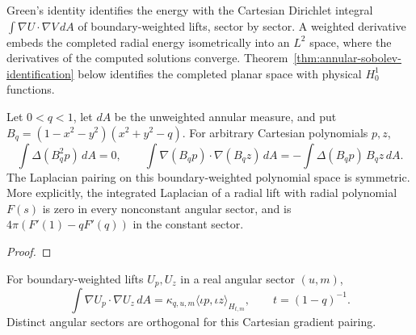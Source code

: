 

Green's identity identifies the energy with the Cartesian Dirichlet integral
$\int\nabla U\cdot\nabla V\,dA$ of boundary-weighted lifts, sector by sector.
A weighted derivative embeds the completed radial energy isometrically into
an $L^2$ space, where the derivatives of the computed solutions converge.
Theorem~\ref{thm:annular-sobolev-identification} below identifies the completed
planar space with physical $H^1_0$ functions.

\begin{supporting}
\begin{theorem}
\label{thm:annular-polynomial-green}
\leanok
Let $0<q<1$, let $dA$ be the unweighted annular measure, and put
$B_q=(1-x^2-y^2)(x^2+y^2-q)$. For arbitrary Cartesian polynomials $p,z$,
\[
 \int \Delta(B_q^2p)\,dA=0,\qquad
 \int \nabla(B_qp)\cdot\nabla(B_qz)\,dA
 =-\int \Delta(B_qp)\,B_qz\,dA.
\]
The Laplacian pairing on this boundary-weighted polynomial space is symmetric.
More explicitly, the integrated Laplacian of a radial lift with radial polynomial
$F(s)$ is zero in every nonconstant angular sector, and is
$4\pi(F'(1)-qF'(q))$ in the constant sector.
\end{theorem}
\begin{proof}
\leanok
\end{proof}

\begin{theorem}
\label{thm:annular-cartesian-energy}
\leanok
For boundary-weighted lifts $U_p,U_z$ in a real angular sector $(u,m)$,
\[
 \int \nabla U_p\cdot\nabla U_z\,dA
 =\kappa_{q,u,m}\langle\iota p,\iota z\rangle_{H_{t,m}},
 \qquad t=(1-q)^{-1}.
\]
Distinct angular sectors are orthogonal for this Cartesian gradient pairing.


\end{theorem}
\end{supporting}
